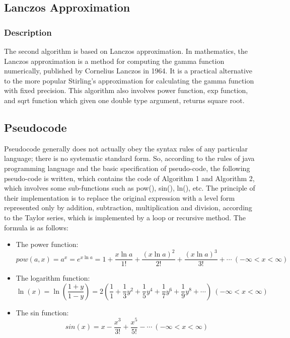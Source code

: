 \documentclass{report}
\begin{document}
\subsection{Lanczos Approximation}
\subsubsection{Description}
The second algorithm is based on Lanczos approximation\cite{enwiki:1095709670}. In mathematics, the Lanczos approximation is a method for computing the gamma function numerically, published by Cornelius Lanczos in 1964. It is a practical alternative to the more popular Stirling's approximation\cite{enwiki:1068285162} for calculating the gamma function with fixed precision. This algorithm also involves power function, exp function, and sqrt function which given one double type argument, returns square root.
\subsection{Pseudocode} 
Pseudocode generally does not actually obey the syntax rules of any particular language; there is no systematic standard form\cite{enwiki:1101060705}. So, according to the rules of java programming language and the basic specification of pseudo-code, the following pseudo-code is written, which contains the code of Algorithm 1 and Algorithm 2, which involves some sub-functions such as pow(), sin(), ln(), etc. The principle of their implementation is to replace the original expression with a level form represented only by addition, subtraction, multiplication and division, according to the Taylor series\cite{enwiki:1097849466}, which is implemented by a loop or recursive method. The formula is as follows:
\begin{itemize}
\item The power function:
\\ $$pow(a,x)=a^{x} = e^{x\ln{a} }=1+\frac{x\ln{a}}{1!}+\frac{(x\ln{a})^{2}}{2!}+\frac{(x\ln{a})^{3}}{3!}+\cdots \ (-\infty < x < \infty)$$
\item The logarithm function:
\\ $$\ln(x)=\ln{(\frac{1+y}{1-y})}=2(\frac{1}{1}+\frac{1}{3}y^2+\frac{1}{5}y^4+\frac{1}{7}y^6+\frac{1}{9}y^8+\cdots )  \ (-\infty < x < \infty)$$
\item The sin function:
\\ $$sin(x)= x-\frac{x^{3} }{3!} +\frac{x^{5}}{5!}-\cdots \ (-\infty < x < \infty)$$
\end{itemize}
\end{document}

